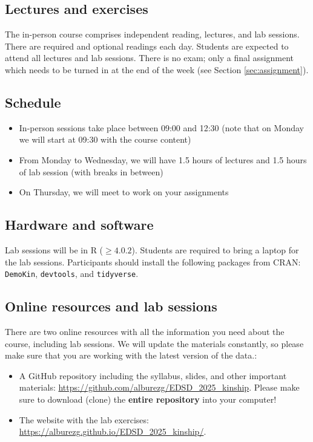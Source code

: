 ﻿\documentclass{article}
\begin{document}
\subsection{Lectures and exercises}

The in-person course comprises independent reading, lectures, and lab sessions. There are required and optional readings each day. Students are expected to attend all lectures and lab sessions. There is no exam; only a final assignment which needs to be turned in at the end of the week (see Section \ref{sec:assignment}).  

\subsection*{Schedule}

\begin{itemize}
    \item In-person sessions take place between 09:00 and 12:30 (note that on Monday we will start at 09:30 with the course content)
    \item From Monday to Wednesday, we will have 1.5 hours of lectures and 1.5 hours of lab session (with breaks in between)
    \item On Thursday, we will meet to work on your assignments 
\end{itemize}

\subsection{Hardware and software}

Lab sessions will be in R ($\geq4.0.2$). 
Students are required to bring a laptop for the lab sessions. 
Participants should install the following packages from CRAN:  \texttt{DemoKin}, \texttt{devtools}, and \texttt{tidyverse}.

\subsection{Online resources and lab sessions}

There are two online resources with all the information you need about the course, including lab sessions. We will update the materials constantly, so please make sure that you are working with the latest version of the data.:

\begin{itemize}
    \item A GitHub repository including the syllabus, slides, and other important materials: \url{https://github.com/alburezg/EDSD_2025_kinship}. Please make sure to download (clone) the \textbf{entire repository} into your computer!
    \item The website with the lab exercises: \url{https://alburezg.github.io/EDSD_2025_kinship/}.
\end{itemize}
\end{document}
